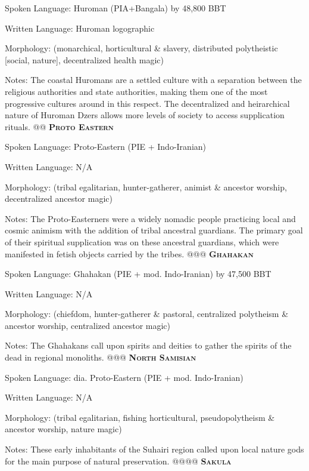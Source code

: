 \documentclass[12pt]{article}
\begin{document}
\begin{easylist}
	\normalfont Spoken Language: Huroman (PIA+Bangala) by 48,800 BBT
	
	Written Language: Huroman logographic
	
	Morphology: (monarchical, horticultural \& slavery, distributed polytheistic [social, nature], decentralized health magic)
	
	{\footnotesize Notes: The coastal Huromans are a settled culture with a separation between the religious authorities and state authorities, making them one of the most progressive cultures around in this respect. The decentralized and heirarchical nature of Huroman Dzers allows more levels of society to access supplication rituals.}
	@@ \textsc{\textbf{Proto Eastern}}
	
	\normalfont Spoken Language: Proto-Eastern (PIE + Indo-Iranian)
	
	Written Language: N/A
	
	Morphology: (tribal egalitarian, hunter-gatherer, animist \& ancestor worship, decentralized ancestor magic)
	
	{\footnotesize Notes: The Proto-Easterners were a widely nomadic people practicing local and cosmic animism with the addition of tribal ancestral guardians. The primary goal of their spiritual supplication was on these ancestral guardians, which were manifested in fetish objects carried by the tribes.}
	@@@ \textsc{\textbf{Ghahakan}}
	
	\normalfont Spoken Language: Ghahakan (PIE + mod. Indo-Iranian) by 47,500 BBT
	
	Written Language: N/A
	
	Morphology: (chiefdom, hunter-gatherer \& pastoral, centralized polytheism \& ancestor worship, centralized ancestor magic)
	
	{\footnotesize Notes: The Ghahakans call upon spirits and deities to gather the spirits of the dead in regional monoliths.}
	@@@ \textsc{\textbf{North Samisian}}
	
	\normalfont Spoken Language: dia. Proto-Eastern (PIE + mod. Indo-Iranian) %
	
	Written Language: N/A
	
	Morphology: (tribal egalitarian, fishing horticultural, pseudopolytheism \& ancestor worship, nature magic)
	
	{\footnotesize Notes: These early inhabitants of the Suhairi region called upon local nature gods for the main purpose of natural preservation.}
	@@@@ \textsc{\textbf{Sakula}}
	

\end{easylist}
\end{document}
